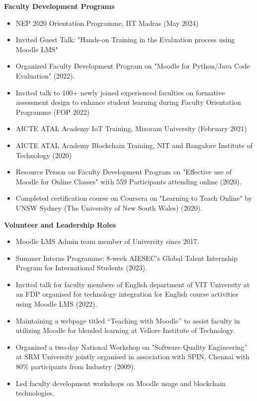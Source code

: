 \documentclass[a4paper,10pt]{article}
\newcommand{\cvsection}[1]{%
    \vspace{2mm}
    \begin{tcolorbox}
        \textbf{\large #1}
    \end{tcolorbox}
    \vspace{-4mm}
}
\begin{document}
\cvsection{Faculty Development Programs}
\begin{itemize}[leftmargin=*]
    \item NEP 2020 Orientation Programme, IIT Madras (May 2024)
    \item Invited Guest Talk: "Hands-on Training in the Evaluation process using Moodle LMS"
    \item Organized Faculty Development Program on "Moodle for Python/Java Code Evaluation" (2022).
    \item Invited talk to 100+ newly joined experienced faculties on formative assessment design to enhance student learning during Faculty Orientation Programme (FOP 2022)
    \item AICTE ATAL Academy IoT Training, Mizoram University (February 2021)
    \item AICTE ATAL Academy Blockchain Training, NIT and Bangalore Institute of Technology (2020)
    \item Resource Person on Faculty Development Program on "Effective use of Moodle for Online Classes" with 559 Participants attending online (2020).
    \item Completed certification course on Coursera on "Learning to Teach Online" by UNSW Sydney (The University of New South Wales) (2020).
\end{itemize}

\cvsection{Volunteer and Leadership Roles}
\begin{itemize}[leftmargin=*]
	\item Moodle LMS Admin team member of University since 2017.
	\item Summer Interns Programme: 8-week AIESEC's Global Talent Internship Program for International Students (2023).
	\item Invited talk for faculty members of English department of VIT University at an FDP organised for technology integration for English course activities using Moodle LMS (2022).
	\item Maintaining a webpage titled “Teaching with Moodle” to assist faculty in utilizing Moodle for blended learning at Vellore Institute of Technology. 
    \item Organized a two-day National Workshop on "Software Quality Engineering” at SRM University jointly organised in association with SPIN, Chennai with 80\% participants from Industry (2009).
    \item Led faculty development workshops on Moodle usage and blockchain technologies.
    
\end{itemize}
\end{document}
